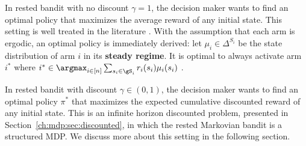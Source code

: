In rested bandit with no discount $\gamma=1$, the decision maker wants to find an optimal policy that maximizes the average reward of any initial state.
This setting is well treated in the literature \cite{anantharam1987asymptotically, tekin2010online}.
With the assumption that each arm is ergodic, an optimal policy is immediately derived: let $\mu_i\in\Delta^{S_i}$ be the state distribution of arm $i$ in its \textbf{steady regime}.
It is optimal to always activate arm $i^*$ where $i^*\in\argmax_{i\in[n]}\sum_{s_i\in\gS_i}r_i(s_i)\mu_i(s_i)$ \cite{tekin2010online}.


In rested bandit with discount $\gamma\in(0,1)$, the decision maker wants to find an optimal policy $\pi^*$ that maximizes the expected cumulative discounted reward of any initial state.
This is an infinite horizon discounted problem, presented in Section~\ref{ch:mdp:sec:discounted}, in which the rested Markovian bandit is a structured MDP.
We discuss more about this setting in the following section.

